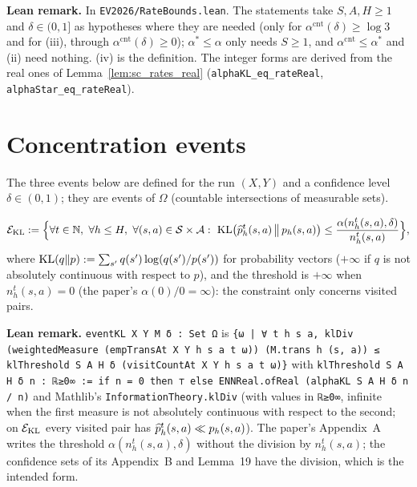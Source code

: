 \textbf{Lean remark.} In \texttt{EV2026/RateBounds.lean}. The statements take $S, A, H \ge 1$
and $\delta \in (0, 1]$ as hypotheses where they are needed (only for $\alpha^{\mathrm{cnt}}(\delta) \ge \log 3$
and for (iii), through $\alpha^{\mathrm{cnt}}(\delta) \ge 0$); $\alpha^* \le \alpha$ only needs $S \ge 1$, and
$\alpha^{\mathrm{cnt}} \le \alpha^*$ and (ii) need nothing. (iv) is the definition. The integer forms are
derived from the real ones of Lemma~\ref{lem:sc_rates_real}
(\texttt{alphaKL\_eq\_rateReal}, \texttt{alphaStar\_eq\_rateReal}).

\section{Concentration events}
\label{sec:empirical_events}

The three events below are defined for the run $(X, Y)$ and a confidence level
$\delta \in (0, 1)$; they are events of $\Omega$ (countable intersections of measurable sets).

\begin{definition}\label{def:event_kl}
\leanok
{}
\[
  \mathcal{E}_{\mathrm{KL}} := \Big\{ \forall t \in \mathbb{N},\ \forall h \le H,\ \forall (s, a) \in \mathcal{S} \times \mathcal{A} :\
    \mathrm{KL}\big(\widehat{p}_h^t(s, a) \,\big\|\, p_h(s, a)\big) \le \frac{\alpha(n_h^t(s, a), \delta)}{n_h^t(s, a)} \Big\},
\]
where $\mathrm{KL}(q \| p) := \sum_{s'} q(s') \log(q(s')/p(s'))$ for probability vectors ($+\infty$ if
$q$ is not absolutely continuous with respect to $p$), and the threshold is $+\infty$ when
$n_h^t(s, a) = 0$ (the paper's $\alpha(0)/0 = \infty$): the constraint only concerns visited pairs.
\end{definition}

\textbf{Lean remark.} \texttt{eventKL X Y M δ : Set Ω} is
\texttt{\{ω | ∀ t h s a, klDiv (weightedMeasure (empTransAt X Y h s a t ω)) (M.trans h (s, a)) ≤ klThreshold S A H δ (visitCountAt X Y h s a t ω)\}}
with \texttt{klThreshold S A H δ n : ℝ≥0∞ := if n = 0 then ⊤ else ENNReal.ofReal (alphaKL S A H δ n / n)}
and Mathlib's \texttt{InformationTheory.klDiv} (with values in \texttt{ℝ≥0∞}, infinite when the
first measure is not absolutely continuous with respect to the second; on $\mathcal{E}_{\mathrm{KL}}$ every
visited pair has $\widehat{p}_h^t(s, a) \ll p_h(s, a)$). The paper's Appendix~A writes the threshold
$\alpha(n_h^t(s, a), \delta)$ without the division by $n_h^t(s, a)$; the confidence sets of its
Appendix~B and Lemma~19 have the division, which is the intended form.

